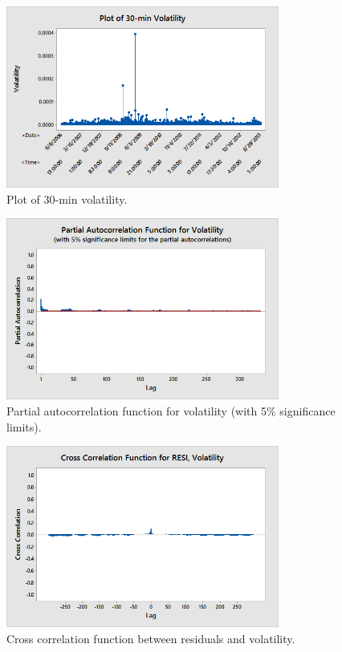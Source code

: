         \begin{figure}[!ht]
        \centering
        \includegraphics[width=0.8\textwidth]{chapters/chapter_stat_ts/figures/30min.png}
        \caption{Plot of 30-min volatility. \label{fig:30min}}
        \end{figure}
        
        \begin{figure}[!ht]
        \centering
        \includegraphics[width=0.8\textwidth]{chapters/chapter_stat_ts/figures/funvol.png}
        \caption{Partial autocorrelation function for volatility (with 5\% significance limits). \label{fig:funvol}}
        \end{figure}
        
        \begin{figure}[!ht]
        \centering
        \includegraphics[width=0.8\textwidth]{chapters/chapter_stat_ts/figures/resivol.png}
        \caption{Cross correlation function between residuals and volatility. \label{fig:ccresi}}
        \end{figure}



